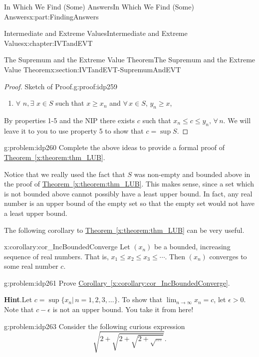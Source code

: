 \documentclass[oneside,10pt,]{book}
\newcommand{\blocktitlefont}{\relax}
\newcommand{\xreffont}{\relax}
\numberwithin{equation}{section}
\def\limit#1#2#3{{\displaystyle\lim_{#1\rightarrow #2}#3}}
\begin{document}
\begin{partptx}{In Which We Find (Some) Answers}{}{In Which We Find (Some) Answers}{}{}{x:part:FindingAnswers}
\begin{chapterptx}{Intermediate and Extreme Values}{}{Intermediate and Extreme Values}{}{}{x:chapter:IVTandEVT}
\begin{sectionptx}{The Supremum and the Extreme Value Theorem}{}{The Supremum and the Extreme Value Theorem}{}{}{x:section:IVTandEVT-SupremumAndEVT}
\begin{proof}{Sketch of Proof.}{g:proof:idp259}
\begin{enumerate}
\item{}\(\forall\) \(n,\exists\) \(x\in S\) such that \(x\geq x_n\) and \(\forall\,x\in S\), \(y_n\geq x\),%
\end{enumerate}
%
\par
By properties 1-5 and the NIP there exists \(c\) such that \(x_n\leq c\leq y_n,\,\forall\,n\). We will leave it to you to use property 5 to show that \(c=\sup S\).%
\end{proof}
\begin{problem}{}{g:problem:idp260}%
 Complete the above ideas to provide a formal proof of \hyperref[x:theorem:thm_LUB]{Theorem~{\xreffont\ref{x:theorem:thm_LUB}}}.%
\end{problem}
Notice that we really used the fact that \(S\) was non-empty and bounded above in the proof of \hyperref[x:theorem:thm_LUB]{Theorem~{\xreffont\ref{x:theorem:thm_LUB}}}. This makes sense, since a set which is not bounded above cannot possibly have a least upper bound. In fact, any real number is an upper bound of the empty set so that the empty set would not have a least upper bound.%
\par
The following corollary to \hyperref[x:theorem:thm_LUB]{Theorem~{\xreffont\ref{x:theorem:thm_LUB}}} can be very useful.%
\begin{corollary}{}{}{x:corollary:cor_IncBoundedConverge}%
Let \((x_n)\) be a bounded, increasing sequence of real numbers. That is, \(x_1\leq x_2\leq x_3\leq\cdots\). Then \((x_n)\) converges to some real number \(c\).%
\end{corollary}
\begin{problem}{}{g:problem:idp261}%
 Prove \hyperref[x:corollary:cor_IncBoundedConverge]{Corollary~{\xreffont\ref{x:corollary:cor_IncBoundedConverge}}}.%
\par\smallskip%
\noindent\textbf{\blocktitlefont Hint}.\hypertarget{g:hint:idp262}{}\quad{}Let \(c=\sup\{x_n|\,n=1,2,3,\ldots\}\). To show that \(\limit{n}{\infty}{x_n}=c\), let \(\epsilon>0.\)Note that \(c-\epsilon\) is not an upper bound. You take it from here!%
\end{problem}
\begin{problem}{}{g:problem:idp263}%
 Consider the following curious expression%
\begin{equation*}
\sqrt{2+\sqrt{2+\sqrt{2+\sqrt{...}}}}\text{.}
\end{equation*}

\end{problem}
\end{sectionptx}
\end{chapterptx}
\end{partptx}
\end{document}
